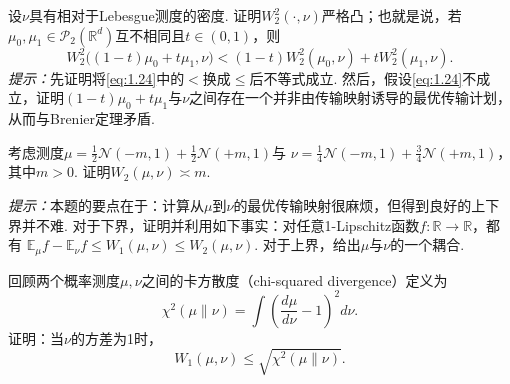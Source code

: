 \begin{exercise}\label{exer:5}\label{exer:1.5}
设$\nu$具有相对于Lebesgue测度的密度. 证明$W_2^2(\cdot,\nu)$严格凸；也就是说，若$\mu_0,\mu_1\in\mathcal P_2(\mathbb R^d)$互不相同且$t\in(0,1)$，则
\begin{equation}\label{eq:1.24}
W_2^2\bigl((1-t)\mu_0+t\mu_1,\nu\bigr)
<(1-t)W_2^2(\mu_0,\nu)+tW_2^2(\mu_1,\nu).
\end{equation}
\emph{提示：}先证明将\eqref{eq:1.24}中的$<$换成$\leq$后不等式成立. 然后，假设\eqref{eq:1.24}不成立，证明$(1-t)\mu_0+t\mu_1$与$\nu$之间存在一个并非由传输映射诱导的最优传输计划，从而与Brenier定理矛盾.
\end{exercise}

\begin{exercise}\label{exer:6}\label{exer:1.6}
考虑测度$\mu=\frac12\mathcal N(-m,1)+\frac12\mathcal N(+m,1)$与
$\nu=\frac14\mathcal N(-m,1)+\frac34\mathcal N(+m,1)$，其中$m>0$. 证明$W_2(\mu,\nu)\asymp m$.

\emph{提示：}本题的要点在于：计算从$\mu$到$\nu$的最优传输映射很麻烦，但得到良好的上下界并不难. 对于下界，证明并利用如下事实：对任意1-Lipschitz函数$f:\mathbb R\to\mathbb R$，都有
$\mathbb E_\mu f-\mathbb E_\nu f\leq W_1(\mu,\nu)\leq W_2(\mu,\nu)$. 对于上界，给出$\mu$与$\nu$的一个耦合.
\end{exercise}

\begin{exercise}\label{exer:7}\label{exer:1.7}
回顾两个概率测度$\mu,\nu$之间的卡方散度（chi-squared divergence）定义为
$$
\chi^2(\mu\mathbin\|\nu)=\int\left(\frac{d\mu}{d\nu}-1\right)^2d\nu.
$$
证明：当$\nu$的方差为1时，
$$
W_1(\mu,\nu)\leq\sqrt{\chi^2(\mu\mathbin\|\nu)}.
$$
\end{exercise}

